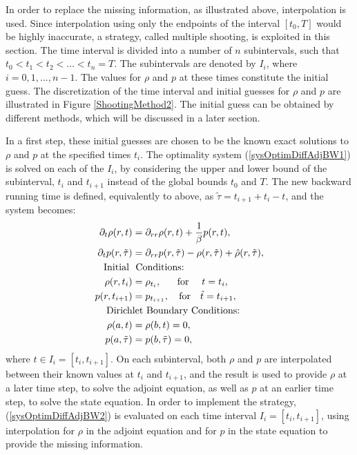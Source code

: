 In order to replace the missing information, as illustrated above, interpolation is used. Since interpolation using only the endpoints of the interval $[t_0,T]$ would be highly inaccurate, a strategy, called multiple shooting, is exploited in this section. 
The time interval is divided into a number of $n$ subintervals, such that $t_0 < t_1<t_2<...<t_n=T$. The subintervals are denoted by $I_i$, where $i=0,1,...,n-1$. The values for $\rho$ and ${p}$ at these times constitute the initial guess. The discretization of the time interval and initial guesses for $\rho$ and $p$ are illustrated in Figure \ref{ShootingMethod2}. The initial guess can be obtained by different methods, which will be discussed in a later section.


In a first step, these initial guesses are chosen to be the known exact solutions to $\rho$ and ${p}$ at the specified times $t_i$. 
The optimality system (\ref{sysOptimDiffAdjBW1}) is solved on each of the $I_i$, by considering the upper and lower bound of the subinterval, $t_i$ and $t_{i+1}$ instead of the global bounds $t_0$ and $T$. The new backward running time is defined, equivalently to above, as $\tilde\tau =t_{i+1}+t_i-t$, and the system becomes:
\begin{align} \label{sysOptimDiffAdjBW2}
\partial_t \rho(r,t) &= \partial_{rr}\rho(r,t) + \frac{1}{\beta}{p}(r,t), \\
\partial_t {p}(r,\tilde\tau) &= \partial_{rr}{p}(r,\tilde\tau) - \rho(r,\tilde\tau) +\hat{\rho}(r,\tilde\tau), \notag \\
\text{Initial   } & \text{ Conditions:} \notag  \\
\rho(r,t_i)&=\rho_{t_i}, \quad \ \ \text{for} \ \quad t=t_i, \notag \\
{p}(r,t_{i+1}) &=p_{t_{i+1}}, \quad \text{for} \quad \tilde t=t_{i+1}, \notag \\
\text{Dirich} &\text{let  Boundary Conditions:} \notag \\
\rho(a,t) &=\rho(b,t)=0, \notag \\
{p}(a,\tilde\tau) &={p}(b,\tilde\tau)=0, \notag 
\end{align} 
where $t \in I_{i}=[t_i,t_{i+1}]$.
On each subinterval, both $\rho$ and ${p}$ are interpolated between their known values at $t_i$ and $t_{i+1}$, and the result is used to provide $\rho$ at a later time step, to solve the adjoint equation, as well as ${p}$ at an earlier time step, to solve the state equation. 
\newline
\newline
In order to implement the strategy, (\ref{sysOptimDiffAdjBW2}) is evaluated on each time interval $I_i=[t_i,t_{i+1}]$, using interpolation for $\rho$ in the adjoint equation and for $ {p}$ in the state equation to provide the missing information.

